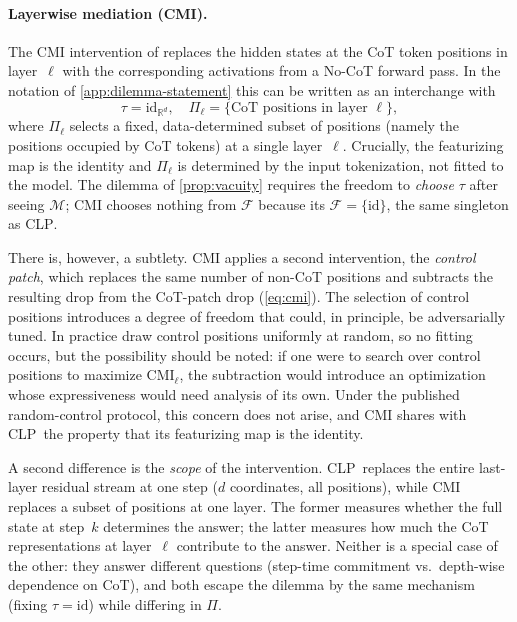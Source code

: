 \documentclass[11pt]{article}
\newcommand{\stepk}{k}
\newcommand{\CLP}{\textsc{CLP}}
\begin{document}
\paragraph{Layerwise mediation (CMI).}
The CMI intervention of \citet{DBLP:journals/corr/abs-2602-03994} replaces the hidden states at
the CoT token positions in layer~$\ell$ with the corresponding activations from
a No-CoT forward pass. In the notation of \cref{app:dilemma-statement} this can
be written as an interchange with
\begin{equation}
\label{eq:cmi-align}
\tau = \mathrm{id}_{\mathbb{R}^{d}}, \quad
\Pi_\ell = \bigl\{\text{CoT positions in layer } \ell\bigr\},
\end{equation}
where $\Pi_\ell$ selects a fixed, data-determined subset of positions (namely
the positions occupied by CoT tokens) at a single layer~$\ell$. Crucially, the
featurizing map is the identity and $\Pi_\ell$ is determined by the input
tokenization, not fitted to the model. The dilemma of \cref{prop:vacuity}
requires the freedom to \emph{choose} $\tau$ after seeing $\mathcal{M}$; CMI
chooses nothing from $\mathcal{F}$ because its $\mathcal{F}=\{\mathrm{id}\}$,
the same singleton as \CLP.

There is, however, a subtlety. CMI applies a second intervention, the
\emph{control patch}, which replaces the same number of non-CoT positions and
subtracts the resulting drop from the CoT-patch drop (\cref{eq:cmi}).
The selection of control positions introduces a degree of freedom that could,
in principle, be adversarially tuned. In practice
\citet{DBLP:journals/corr/abs-2602-03994} draw control positions uniformly at random, so no
fitting occurs, but the possibility should be noted: if one were to search over
control positions to maximize $\mathrm{CMI}_\ell$, the subtraction would
introduce an optimization whose expressiveness would need analysis of its own.
Under the published random-control protocol, this concern does not arise, and
CMI shares with \CLP\ the property that its featurizing map is the identity.

A second difference is the \emph{scope} of the intervention. \CLP\ replaces the
entire last-layer residual stream at one step ($d$ coordinates, all positions),
while CMI replaces a subset of positions at one layer. The former measures
whether the full state at step~$\stepk$ determines the answer; the latter
measures how much the CoT representations at layer~$\ell$ contribute to the
answer. Neither is a special case of the other: they answer different questions
(step-time commitment vs.\ depth-wise dependence on CoT), and both escape the
dilemma by the same mechanism (fixing $\tau=\mathrm{id}$) while differing in
$\Pi$.
\end{document}
